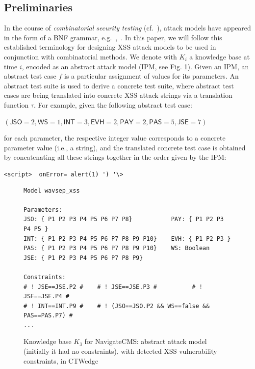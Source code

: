 \begin{tikzborder}{\cite{Gargantini16:validation}}
\begin{tikzborder}{\cite{gargantini_combinatorial_2017}}
\begin{tikzborder}{\cite{gargantini_combinatorial_2017}}
\subsection{Preliminaries}\label{sec:xssbasic}
\begin{tikzborder}{\cite{garn2019}}
In the course of \emph{combinatorial security testing} (cf.~\cite{SKVKS2016:IEEEComp}), attack models have appeared in the
form of a BNF grammar, e.g.~\cite{bozic2015attack},~\cite{wotawa_combinatorial_2016}. 
In this paper, we will follow this established terminology for designing XSS attack models to be used in conjunction with combinatorial methods.  
We denote with $K_{i}$ a knowledge base at time $i$, encoded as an abstract attack model (IPM, see Fig. \ref{fig:model1}).
Given an IPM, an abstract test case $f$ is a particular assignment of values for its parameters. 
An abstract test suite is used to derive a concrete test suite, where abstract test cases are being translated into concrete XSS attack strings via a translation function $\tau$.
For example, given the following abstract test case:
\be

\begin{center}
$(\textsf{JSO}=2,\textsf{WS}=1,\textsf{INT}=3,\textsf{EVH}=2,\textsf{PAY}=2,\textsf{PAS}=5,\textsf{JSE}=7)$
\end{center} 

\bb for each parameter, the respective integer value corresponds to a concrete parameter value (i.e., a string), and the translated concrete test case is obtained by concatenating all these strings together in the order given by the IPM: 
\be

\begin{center}
\lstinline[basicstyle=\ttfamily]!<script>  onError= alert(1) ') '\>!
\end{center}

\begin{figure}[H]
\begin{lstlisting}[basicstyle=\linespread{1}\sffamily\scriptsize,frame = single,morekeywords={Model,Parameters,Constraints,false,Boolean}]
Model wavsep_xss

Parameters:
JSO: { P1 P2 P3 P4 P5 P6 P7 P8}           PAY: { P1 P2 P3 P4 P5 }    
INT: { P1 P2 P3 P4 P5 P6 P7 P8 P9 P10}    EVH: { P1 P2 P3 }
PAS: { P1 P2 P3 P4 P5 P6 P7 P8 P9 P10}    WS: Boolean
JSE: { P1 P2 P3 P4 P5 P6 P7 P8 P9}

Constraints:
# ! JSE==JSE.P2 #    # ! JSE==JSE.P3 #          # ! JSE==JSE.P4 #
# ! INT==INT.P9 #    # ! (JSO==JSO.P2 && WS==false && PAS==PAS.P7) #
...
\end{lstlisting}
\caption{Knowledge base $K_3$ for NavigateCMS: abstract attack model (initially it had no constraints), with detected XSS vulnerability constraints, in CTWedge}\label{fig:model1}
\end{figure}


\end{tikzborder}
\end{tikzborder}
\end{tikzborder}
\end{tikzborder}
